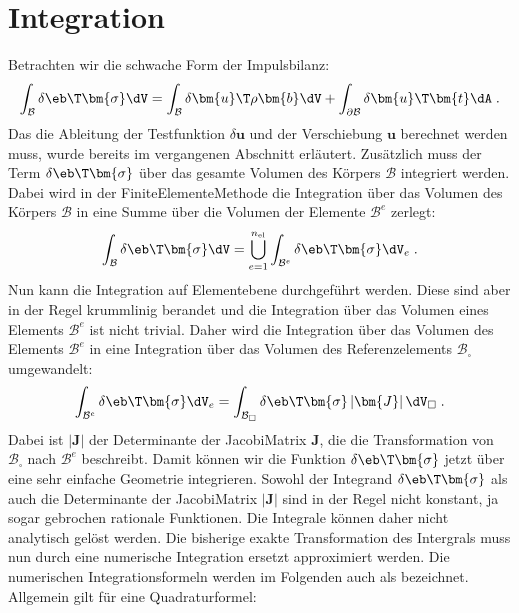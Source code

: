\documentclass[letterpaper,10pt,german]{jupyterBook}
\begin{document}
\section{Integration}
\label{\detokenize{chapters/chapter3/Integration:integration}}\label{\detokenize{chapters/chapter3/Integration::doc}}
\sphinxAtStartPar
Betrachten wir die schwache Form der Impulsbilanz:
\begin{equation*}
\begin{split}\int_{\mathcal{B}} \delta\eb\T  \bm{\sigma} \dV = \int_{\mathcal{B}} \delta \bm{u}\T \rho \bm{b} \dV + \int_{\partial\mathcal{B}} \delta \bm{u}\T  \bm{t} \dA \; .\end{split}
\end{equation*}
\sphinxAtStartPar
Das die Ableitung der Testfunktion \(\delta \bm{u}\) und der Verschiebung \(\bm{u}\) berechnet werden muss, wurde bereits im vergangenen Abschnitt erläutert. Zusätzlich muss der Term \(\delta\eb\T  \bm{\sigma}\) über das gesamte Volumen des Körpers \(\mathcal{B}\) integriert werden. Dabei wird in der Finite\sphinxhyphen{}Elemente\sphinxhyphen{}Methode die Integration über das Volumen des Körpers \(\mathcal{B}\) in eine Summe über die Volumen der Elemente \(\mathcal{B}^e\) zerlegt:
\begin{equation*}
\begin{split}\int_{\mathcal{B}} \delta\eb\T  \bm{\sigma} \dV = \bigcup_{e=1}^{n_{\text{el}}} \int_{\mathcal{B}^e} \delta\eb\T  \bm{\sigma} \dV_e \; .\end{split}
\end{equation*}
\sphinxAtStartPar
Nun kann die Integration auf Elementebene durchgeführt werden. Diese sind aber in der Regel krummlinig berandet und die Integration über das Volumen eines Elements \(\mathcal{B}^e\) ist nicht trivial. Daher wird die Integration über das Volumen des Elements \(\mathcal{B}^e\) in eine Integration über das Volumen des Referenzelements \(\mathcal{B}_{\square}\) umgewandelt:
\begin{equation*}
\begin{split}\int_{\mathcal{B}^e} \delta\eb\T  \bm{\sigma} \dV_e = \int_{\mathcal{B}_{\square}} \delta\eb\T  \bm{\sigma} \left| \bm{J} \right| \dV_{\square} \; .\end{split}
\end{equation*}
\sphinxAtStartPar
Dabei ist \(\left| \bm{J} \right|\) der Determinante der Jacobi\sphinxhyphen{}Matrix \(\bm{J}\), die die Transformation von \(\mathcal{B}_{\square}\) nach \(\mathcal{B}^e\) beschreibt. Damit können wir die Funktion \(\delta\eb\T  \bm{\sigma}\) jetzt über eine sehr einfache Geometrie integrieren. Sowohl der Integrand \(\delta\eb\T  \bm{\sigma}\) als auch die Determinante der Jacobi\sphinxhyphen{}Matrix \(\left| \bm{J} \right|\) sind in der Regel nicht konstant, ja sogar gebrochen rationale Funktionen. Die Integrale können daher nicht analytisch gelöst werden. Die bisherige exakte Transformation des Intergrals muss nun durch eine numerische Integration ersetzt approximiert werden. Die numerischen Integrationsformeln werden im Folgenden auch als  bezeichnet. Allgemein gilt für eine Quadraturformel:
\end{document}
